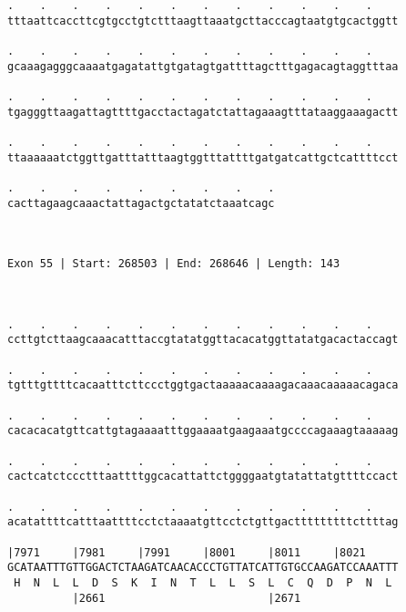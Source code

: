\documentclass{article}
\begin{document}
\begin{Verbatim}
.    .    .    .    .    .    .    .    .    .    .    .    
tttaattcaccttcgtgcctgtctttaagttaaatgcttacccagtaatgtgcactggtt
                                                            
.    .    .    .    .    .    .    .    .    .    .    .    
gcaaagagggcaaaatgagatattgtgatagtgattttagctttgagacagtaggtttaa
                                                            
.    .    .    .    .    .    .    .    .    .    .    .    
tgagggttaagattagttttgacctactagatctattagaaagtttataaggaaagactt
                                                            
.    .    .    .    .    .    .    .    .    .    .    .    
ttaaaaaatctggttgatttatttaagtggtttattttgatgatcattgctcattttcct
                                                            
.    .    .    .    .    .    .    .    .
cacttagaagcaaactattagactgctatatctaaatcagc
                                         
                                         
 
Exon 55 | Start: 268503 | End: 268646 | Length: 143



.    .    .    .    .    .    .    .    .    .    .    .    
ccttgtcttaagcaaacatttaccgtatatggttacacatggttatatgacactaccagt
                                                            
.    .    .    .    .    .    .    .    .    .    .    .    
tgtttgttttcacaatttcttccctggtgactaaaaacaaaagacaaacaaaaacagaca
                                                            
.    .    .    .    .    .    .    .    .    .    .    .    
cacacacatgttcattgtagaaaatttggaaaatgaagaaatgccccagaaagtaaaaag
                                                            
.    .    .    .    .    .    .    .    .    .    .    .    
cactcatctccctttaattttggcacattattctggggaatgtatattatgttttccact
                                                            
.    .    .    .    .    .    .    .    .    .    .    .    
acatattttcatttaattttcctctaaaatgttcctctgttgactttttttttcttttag
                                                            
|7971     |7981     |7991     |8001     |8011     |8021     
GCATAATTTGTTGGACTCTAAGATCAACACCCTGTTATCATTGTGCCAAGATCCAAATTT
 H  N  L  L  D  S  K  I  N  T  L  L  S  L  C  Q  D  P  N  L 
          |2661                         |2671               
  

\end{Verbatim}
\end{document}
